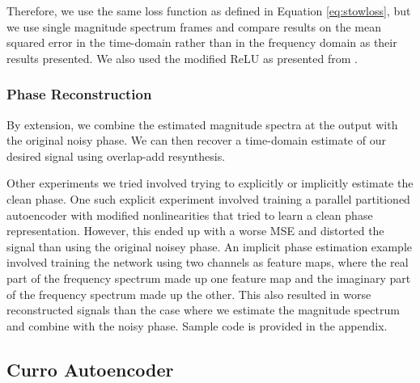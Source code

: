 Therefore, we use the same loss function as defined in Equation \ref{eq:stowloss}, but we use single magnitude spectrum frames and compare results on the mean squared error in the time-domain rather than in the frequency domain as their results presented. We also used the modified ReLU as presented from \cite{liu2014experiments}.

\subsubsection{Phase Reconstruction}

By extension, we combine the estimated magnitude spectra at the output with the original noisy phase. We can then recover a time-domain estimate of our desired signal using overlap-add resynthesis.

Other experiments we tried involved trying to explicitly or implicitly estimate the clean phase. One such explicit experiment involved training a parallel partitioned autoencoder with modified nonlinearities that tried to learn a clean phase representation. However, this ended up with a worse MSE and distorted the signal than using the original noisey phase. An implicit phase estimation example involved training the network using two channels as feature maps, where the real part of the frequency spectrum made up one feature map and the imaginary part of the frequency spectrum made up the other. This also resulted in worse reconstructed signals than the case where we estimate the magnitude spectrum and combine with the noisy phase. Sample code is provided in the appendix.

\subsection{Curro Autoencoder}

